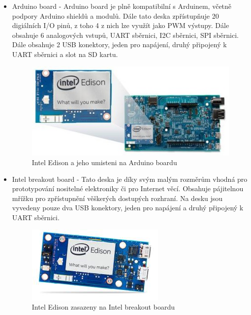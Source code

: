 			\begin{itemize}
				\item Arduino board - Arduino board je plně kompatibilní s Arduinem, včetně podpory Arduino shieldů a modulů. Dále tato deska zpřístupňuje 20 digiálních I/O pinů, z toho 4 z nich lze využít jako PWM výstupy. Dále obsahuje 6 analogových vstupů, UART sběrnici, I2C sběrnici, SPI sběrnici. Dále obsahuje 2 USB konektory, jeden pro napájení, druhý připojený k UART sběrnici a slot na SD kartu.
				\begin{figure}[!h]
  \begin{center}
    \includegraphics[scale=0.5]{obrazky/embed_intel_edison2}
  \end{center}
  \caption{Intel Edison a jeho umisteni na Arduino boardu \cite{IntelEdison}}
\end{figure}

				\item Intel breakout board -  Tato deska je díky svým malým rozměrům vhodná pro prototypování nositelné elektroniky či pro Internet věcí. Obsahuje pájitelnou mřížku pro zpřístupnění věškerých dostupých rozhraní. Na desku jsou vyvedeny pouze dva USB konektory, jeden pro napájení a druhý připojený k UART sběrnici.
				\begin{figure}[!h]
  \begin{center}
    \includegraphics[scale=0.6]{obrazky/embed_intel_edison1}
  \end{center}
  \caption{Intel Edison zasazeny na Intel breakout boardu \cite{IntelEdison}}
\end{figure}
\end{itemize}

